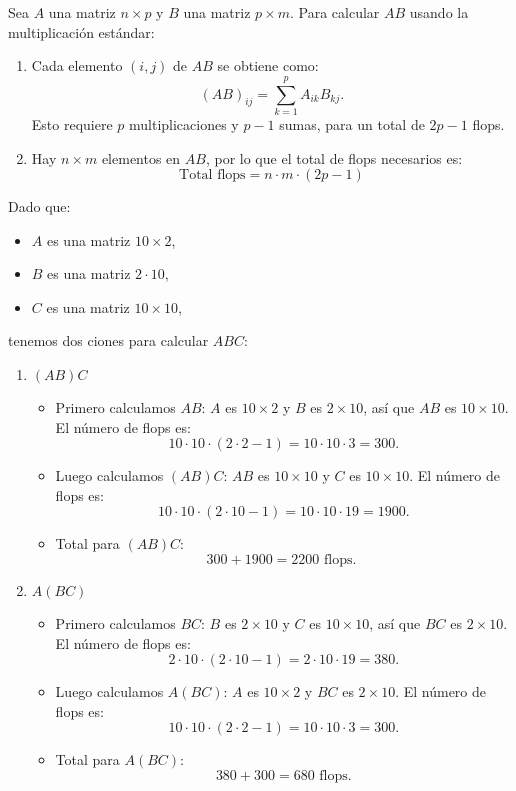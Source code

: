 \begin{enumerate}[label=\color{red}\textbf{\arabic*)}]
    Sea $A$ una matriz $n\times p$ y $B$ una matriz $p\times m$. Para calcular $AB$ usando la multiplicación estándar:
    \begin{enumerate}[label=\arabic*)]
        \item Cada elemento $(i,j)$ de $AB$ se obtiene como: \[
                (AB)_{ij}=\sum_{k=1}^{p} A_{ik}B_{kj}.
        \] 
        Esto requiere $p$ multiplicaciones y $p-1$ sumas, para un total de $2p-1$ flops.
    \item Hay $n\times m$ elementos en $AB$, por lo que el total de flops necesarios es: \[
    \text{Total flops}=n\cdot m\cdot (2p-1)
    \] 
    \end{enumerate}
    Dado que:
    \begin{itemize}[label=\textbullet]
        \item $A$ es una matriz $10\times 2$,
        \item $B$ es una matriz $2\cdot 10$,
        \item $C$ es una matriz $10\times 10$,
    \end{itemize}
    tenemos dos ciones para calcular $ABC$:
     \begin{enumerate}[label=\arabic*)]
        \item $(AB)C$ 
            \begin{itemize}[label=\textbullet]
                \item Primero calculamos $AB$:  $A$ es  $10\times 2$ y $B$ es  $2\times 10$, así que $AB$ es $10\times 10$. El número de flops es: \[
                10\cdot 10\cdot (2\cdot 2-1)=10\cdot 10\cdot 3=300.
                \] 
                \item Luego calculamos $(AB)C$:  $AB$ es  $10\times 10$ y $C$ es  $10\times 10$. El número de flops es: \[
            10\cdot 10\cdot (2\cdot 10-1)=10\cdot 10\cdot 19=1900.
            \]
            
                \item Total para $(AB)C$:  \[
                300+1900=2200\text{ flops. }
                \] 
            \end{itemize}
        \item $A(BC)$
            \begin{itemize}[label=\textbullet]
                \item Primero calculamos $BC$: $B$ es  $2\times 10$ y $C$ es  $10\times 10$, así que $BC$ es $2\times 10$. El número de flops es: \[
                2\cdot 10\cdot (2\cdot 10-1)=2\cdot 10\cdot 19=380.
                \] 
                \item Luego calculamos $A(BC)$:  $A$ es $10\times 2$ y $BC$ es $2\times 10$. El número de flops es: \[
                10\cdot 10\cdot (2\cdot 2-1)=10\cdot 10\cdot 3=300.
                \] 
                \item Total para $A(BC)$: \[
                    380+300=680\text{ flops}.
                 \] 
            \end{itemize}
    \end{enumerate}


\end{enumerate}
